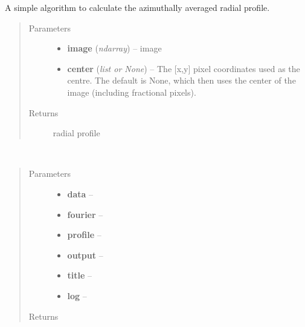 \documentclass[a4paper,11pt,english]{sphinxmanual}
\begin{document}

\begin{fulllineitems}
\label{analysis:analysis.CTIpower.azimuthalAverageSimple}
A simple algorithm to calculate the azimuthally averaged radial profile.
\begin{quote}\begin{description}
\item[{Parameters}] \leavevmode\begin{itemize}
\item {} 
\textbf{image} (\emph{ndarray}) -- image

\item {} 
\textbf{center} (\emph{list or None}) -- The {[}x,y{]} pixel coordinates used as the centre. The default is
None, which then uses the center of the image (including fractional pixels).

\end{itemize}

\item[{Returns}] \leavevmode
radial profile

\end{description}\end{quote}

\end{fulllineitems}


\begin{fulllineitems}
\label{analysis:analysis.CTIpower.plot}~\begin{quote}\begin{description}
\item[{Parameters}] \leavevmode\begin{itemize}
\item {} 
\textbf{data} -- 

\item {} 
\textbf{fourier} -- 

\item {} 
\textbf{profile} -- 

\item {} 
\textbf{output} -- 

\item {} 
\textbf{title} -- 

\item {} 
\textbf{log} -- 

\end{itemize}

\item[{Returns}] \leavevmode


\end{description}\end{quote}

\end{fulllineitems}
\end{document}
